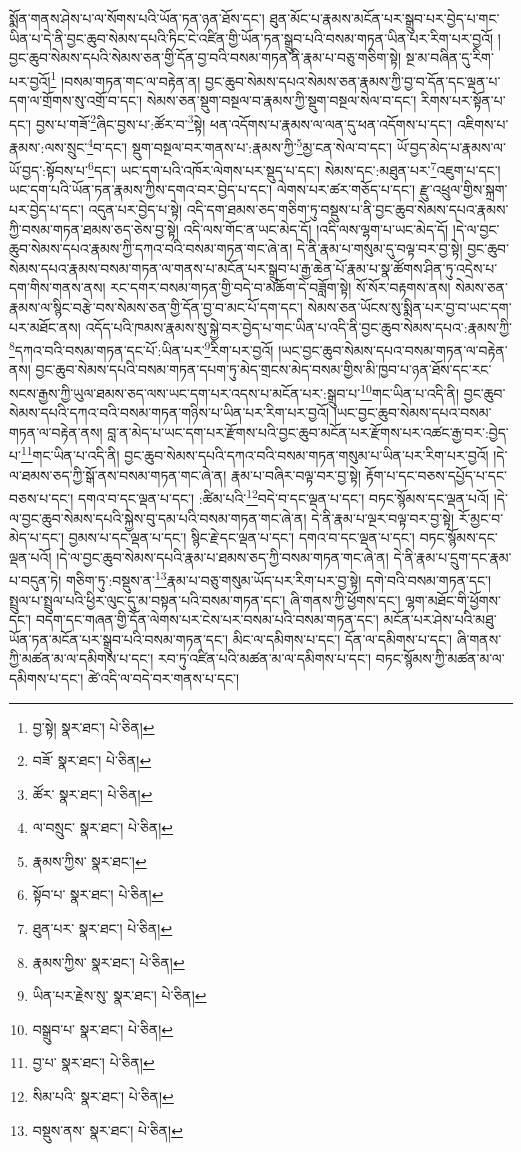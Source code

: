 སྨོན་གནས་ཤེས་པ་ལ་སོགས་པའི་ཡོན་ཏན་ཉན་ཐོས་དང་། ཐུན་མོང་པ་རྣམས་མངོན་པར་སྒྲུབ་པར་བྱེད་པ་གང་ཡིན་པ་དེ་ནི་བྱང་ཆུབ་སེམས་དཔའི་ཏིང་ངེ་འཛིན་གྱི་ཡོན་ཏན་སྒྲུབ་པའི་བསམ་གཏན་ཡིན་པར་རིག་པར་བྱའོ། །བྱང་ཆུབ་སེམས་དཔའི་སེམས་ཅན་གྱི་དོན་བྱ་བའི་བསམ་གཏན་ནི་རྣམ་པ་བཅུ་གཅིག་སྟེ། སྔ་མ་བཞིན་དུ་རིག་པར་བྱའོ།\footnote{བྱ་སྟེ།  སྣར་ཐང་།  པེ་ཅིན། } །བསམ་གཏན་གང་ལ་བརྟེན་ན། བྱང་ཆུབ་སེམས་དཔའ་སེམས་ཅན་རྣམས་ཀྱི་བྱ་བ་དོན་དང་ལྡན་པ་དག་ལ་གྲོགས་སུ་འགྲོ་བ་དང་། སེམས་ཅན་སྡུག་བསྔལ་བ་རྣམས་ཀྱི་སྡུག་བསྔལ་སེལ་བ་དང་། རིགས་པར་སྟོན་པ་དང་། བྱས་པ་གཟོ་\footnote{བཟོ་  སྣར་ཐང་།  པེ་ཅིན། }ཞིང་བྱས་པ་:ཚོར་བ་\footnote{ཚོར་  སྣར་ཐང་།  པེ་ཅིན། }སྟེ། ཕན་འདོགས་པ་རྣམས་ལ་ལན་དུ་ཕན་འདོགས་པ་དང་། འཇིགས་པ་རྣམས་:ལས་སྲུང་\footnote{ལ་བསྲུང་  སྣར་ཐང་།  པེ་ཅིན། }བ་དང་། སྡུག་བསྔལ་བར་གནས་པ་:རྣམས་ཀྱི་\footnote{རྣམས་ཀྱིས་  སྣར་ཐང་། }མྱ་ངན་སེལ་བ་དང་། ཡོ་བྱད་མེད་པ་རྣམས་ལ་ཡོ་བྱད་:སྟོབས་པ་\footnote{སྟོབ་པ་  སྣར་ཐང་།  པེ་ཅིན། }དང་། ཡང་དག་པའི་འཁོར་ལེགས་པར་སྡུད་པ་དང་། སེམས་དང་:མཐུན་པར་\footnote{ཐུན་པར་  སྣར་ཐང་།  པེ་ཅིན། }འཇུག་པ་དང་། ཡང་དག་པའི་ཡོན་ཏན་རྣམས་ཀྱིས་དགའ་བར་བྱེད་པ་དང་། ལེགས་པར་ཚར་གཅོད་པ་དང་། རྫུ་འཕྲུལ་གྱིས་སྐྲག་པར་བྱེད་པ་དང་། འདུན་པར་བྱེད་པ་སྟེ། འདི་དག་ཐམས་ཅད་གཅིག་ཏུ་བསྡུས་པ་ནི་བྱང་ཆུབ་སེམས་དཔའ་རྣམས་ཀྱི་བསམ་གཏན་ཐམས་ཅད་ཅེས་བྱ་སྟེ། འདི་ལས་གོང་ན་ཡང་མེད་དོ། །འདི་ལས་ལྷག་པ་ཡང་མེད་དོ། །དེ་ལ་བྱང་ཆུབ་སེམས་དཔའ་རྣམས་ཀྱི་དཀའ་བའི་བསམ་གཏན་གང་ཞེ་ན། དེ་ནི་རྣམ་པ་གསུམ་དུ་བལྟ་བར་བྱ་སྟེ། བྱང་ཆུབ་སེམས་དཔའ་རྣམས་བསམ་གཏན་ལ་གནས་པ་མངོན་པར་སྒྲུབ་པ་རྒྱ་ཆེན་པོ་རྣམ་པ་སྣ་ཚོགས་ཤིན་ཏུ་འདྲེས་པ་དག་གིས་གནས་ནས། རང་དགར་བསམ་གཏན་གྱི་བདེ་བ་མཆོག་དེ་བཟློག་སྟེ། སོ་སོར་བརྟགས་ནས། སེམས་ཅན་རྣམས་ལ་སྙིང་བརྩེ་བས་སེམས་ཅན་གྱི་དོན་བྱ་བ་མང་པོ་དག་དང་། སེམས་ཅན་ཡོངས་སུ་སྨིན་པར་བྱ་བ་ཡང་དག་པར་མཐོང་ནས། འདོད་པའི་ཁམས་རྣམས་སུ་སྐྱེ་བར་བྱེད་པ་གང་ཡིན་པ་འདི་ནི་བྱང་ཆུབ་སེམས་དཔའ་:རྣམས་ཀྱི་\footnote{རྣམས་ཀྱིས་  སྣར་ཐང་།  པེ་ཅིན། }དཀའ་བའི་བསམ་གཏན་དང་པོ་:ཡིན་པར་\footnote{ཡིན་པར་རྗེས་སུ་  སྣར་ཐང་།  པེ་ཅིན། }རིག་པར་བྱའོ། །ཡང་བྱང་ཆུབ་སེམས་དཔའ་བསམ་གཏན་ལ་བརྟེན་ནས། བྱང་ཆུབ་སེམས་དཔའི་བསམ་གཏན་དཔག་ཏུ་མེད་གྲངས་མེད་བསམ་གྱིས་མི་ཁྱབ་པ་ཉན་ཐོས་དང་རང་སངས་རྒྱས་ཀྱི་ཡུལ་ཐམས་ཅད་ལས་ཡང་དག་པར་འདས་པ་མངོན་པར་:སྒྲུབ་པ་\footnote{བསྒྲུབ་པ་  སྣར་ཐང་།  པེ་ཅིན། }གང་ཡིན་པ་འདི་ནི། བྱང་ཆུབ་སེམས་དཔའི་དཀའ་བའི་བསམ་གཏན་གཉིས་པ་ཡིན་པར་རིག་པར་བྱའོ། །ཡང་བྱང་ཆུབ་སེམས་དཔའ་བསམ་གཏན་ལ་བརྟེན་ནས། བླ་ན་མེད་པ་ཡང་དག་པར་རྫོགས་པའི་བྱང་ཆུབ་མངོན་པར་རྫོགས་པར་འཚང་རྒྱ་བར་:བྱེད་པ་\footnote{བྱ་པ་  སྣར་ཐང་།  པེ་ཅིན། }གང་ཡིན་པ་འདི་ནི། བྱང་ཆུབ་སེམས་དཔའི་དཀའ་བའི་བསམ་གཏན་གསུམ་པ་ཡིན་པར་རིག་པར་བྱའོ། །དེ་ལ་ཐམས་ཅད་ཀྱི་སྒོ་ནས་བསམ་གཏན་གང་ཞེ་ན། རྣམ་པ་བཞིར་བལྟ་བར་བྱ་སྟེ། རྟོག་པ་དང་བཅས་དཔྱོད་པ་དང་བཅས་པ་དང་། དགའ་བ་དང་ལྡན་པ་དང་། :ཚིམ་པའི་\footnote{སིམ་པའི་  སྣར་ཐང་།  པེ་ཅིན། }བདེ་བ་དང་ལྡན་པ་དང་། བཏང་སྙོམས་དང་ལྡན་པའོ། །དེ་ལ་བྱང་ཆུབ་སེམས་དཔའི་སྐྱེས་བུ་དམ་པའི་བསམ་གཏན་གང་ཞེ་ན། དེ་ནི་རྣམ་པ་ལྔར་བལྟ་བར་བྱ་སྟེ། རོ་མྱང་བ་མེད་པ་དང་། བྱམས་པ་དང་ལྡན་པ་དང་། སྙིང་རྗེ་དང་ལྡན་པ་དང་། དགའ་བ་དང་ལྡན་པ་དང་། བཏང་སྙོམས་དང་ལྡན་པའོ། །དེ་ལ་བྱང་ཆུབ་སེམས་དཔའི་རྣམ་པ་ཐམས་ཅད་ཀྱི་བསམ་གཏན་གང་ཞེ་ན། དེ་ནི་རྣམ་པ་དྲུག་དང་རྣམ་པ་བདུན་ཏེ། གཅིག་ཏུ་:བསྡུས་ན་\footnote{བསྡུས་ནས་  སྣར་ཐང་།  པེ་ཅིན། }རྣམ་པ་བཅུ་གསུམ་ཡོད་པར་རིག་པར་བྱ་སྟེ། དགེ་བའི་བསམ་གཏན་དང་། སྤྲུལ་པ་སྤྲུལ་པའི་ཕྱིར་ལུང་དུ་མ་བསྟན་པའི་བསམ་གཏན་དང་། ཞི་གནས་ཀྱི་ཕྱོགས་དང་། ལྷག་མཐོང་གི་ཕྱོགས་དང་། བདག་དང་གཞན་གྱི་དོན་ལེགས་པར་ངེས་པར་བསམ་པའི་བསམ་གཏན་དང་། མངོན་པར་ཤེས་པའི་མཐུ་ཡོན་ཏན་མངོན་པར་སྒྲུབ་པའི་བསམ་གཏན་དང་། མིང་ལ་དམིགས་པ་དང་། དོན་ལ་དམིགས་པ་དང་། ཞི་གནས་ཀྱི་མཚན་མ་ལ་དམིགས་པ་དང་། རབ་ཏུ་འཛིན་པའི་མཚན་མ་ལ་དམིགས་པ་དང་། བཏང་སྙོམས་ཀྱི་མཚན་མ་ལ་དམིགས་པ་དང་། ཚེ་འདི་ལ་བདེ་བར་གནས་པ་དང་། 
